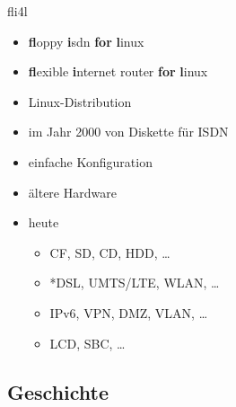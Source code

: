 \documentclass[t]{beamer}
\makeatletter
\newcommand{\strong}[1]{\@strong{#1}}
\newcommand{\@@strong}[1]{\textbf{\let\@strong\@@@strong#1}}
\newcommand{\@@@strong}[1]{\textnormal{\let\@strong\@@strong#1}}
\let\@strong\@@strong
\makeatother
\begin{document}
\begin{frame}{fli4l}
    \begin{itemize}
        \item \strong{fl}oppy \strong{i}sdn \strong{for} \strong{l}inux
        \item \strong{fl}exible \strong{i}nternet router \strong{for} \strong {l}inux
        \item Linux-Distribution
        \item im Jahr 2000 von Diskette für ISDN
        \item einfache Konfiguration
        \item ältere Hardware
        \item heute
            \begin{itemize}
                \item CF, SD, CD, HDD, …
                \item *DSL, UMTS/LTE, WLAN, …
                \item IPv6, VPN, DMZ, VLAN, …
                \item LCD, SBC, …
            \end{itemize}
    \end{itemize}
\end{frame}

\subsection{Geschichte}
\end{document}

